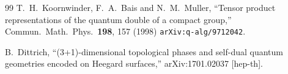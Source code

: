 \documentclass[nofootinbib,superscriptaddress,eqsecnum,tightenlines,11pt]{revtex4-1}
\begin{document}
\begin{thebibliography}{99}
T.~H.~Koornwinder, F.~A.~Bais and N.~M.~Muller,
``Tensor product representations of the quantum double of a compact group,''
Commun.\ Math.\ Phys.\ {\bf 198}, 157 (1998)
\texttt{arXiv:q-alg/9712042}.

B.~Dittrich,
``(3+1)-dimensional topological phases and self-dual quantum geometries encoded on Heegard surfaces,''
arXiv:1701.02037 [hep-th].
  
  
  


\
\end{thebibliography}
\end{document}
